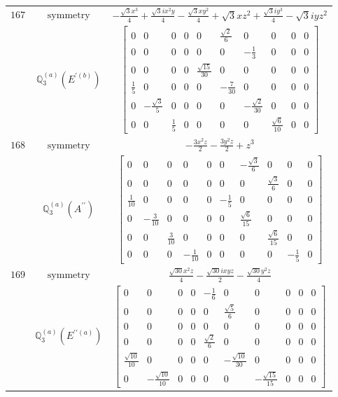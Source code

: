 \documentclass[fleqn,8pt,landscape]{jsarticle}
\begin{document}
\begin{longtable}{ccc}
$ 167 $ & $ \text{symmetry} $ & $ - \frac{\sqrt{3} x^{3}}{4} + \frac{\sqrt{3} i x^{2} y}{4} - \frac{\sqrt{3} x y^{2}}{4} + \sqrt{3} x z^{2} + \frac{\sqrt{3} i y^{3}}{4} - \sqrt{3} i y z^{2} $ \\
$  $ & $ \mathbb{Q}_{3}^{(a)}(E^{\prime(b)}) $ & $ \begin{bmatrix} 0 & 0 & 0 & 0 & 0 & \frac{\sqrt{2}}{6} & 0 & 0 & 0 & 0 \\ 0 & 0 & 0 & 0 & 0 & 0 & - \frac{1}{3} & 0 & 0 & 0 \\ 0 & 0 & 0 & 0 & \frac{\sqrt{15}}{30} & 0 & 0 & 0 & 0 & 0 \\ \frac{1}{5} & 0 & 0 & 0 & 0 & - \frac{7}{30} & 0 & 0 & 0 & 0 \\ 0 & - \frac{\sqrt{3}}{5} & 0 & 0 & 0 & 0 & - \frac{\sqrt{2}}{30} & 0 & 0 & 0 \\ 0 & 0 & \frac{1}{5} & 0 & 0 & 0 & 0 & \frac{\sqrt{6}}{10} & 0 & 0 \end{bmatrix} $ \\ \hline
$ 168 $ & $ \text{symmetry} $ & $ - \frac{3 x^{2} z}{2} - \frac{3 y^{2} z}{2} + z^{3} $ \\
$  $ & $ \mathbb{Q}_{3}^{(a)}(A^{\prime\prime}) $ & $ \begin{bmatrix} 0 & 0 & 0 & 0 & 0 & 0 & - \frac{\sqrt{3}}{6} & 0 & 0 & 0 \\ 0 & 0 & 0 & 0 & 0 & 0 & 0 & \frac{\sqrt{3}}{6} & 0 & 0 \\ \frac{1}{10} & 0 & 0 & 0 & 0 & - \frac{1}{5} & 0 & 0 & 0 & 0 \\ 0 & - \frac{3}{10} & 0 & 0 & 0 & 0 & \frac{\sqrt{6}}{15} & 0 & 0 & 0 \\ 0 & 0 & \frac{3}{10} & 0 & 0 & 0 & 0 & \frac{\sqrt{6}}{15} & 0 & 0 \\ 0 & 0 & 0 & - \frac{1}{10} & 0 & 0 & 0 & 0 & - \frac{1}{5} & 0 \end{bmatrix} $ \\ \hline
$ 169 $ & $ \text{symmetry} $ & $ \frac{\sqrt{30} x^{2} z}{4} - \frac{\sqrt{30} i x y z}{2} - \frac{\sqrt{30} y^{2} z}{4} $ \\
$  $ & $ \mathbb{Q}_{3}^{(a)}(E^{\prime\prime(a)}) $ & $ \begin{bmatrix} 0 & 0 & 0 & 0 & - \frac{1}{6} & 0 & 0 & 0 & 0 & 0 \\ 0 & 0 & 0 & 0 & 0 & \frac{\sqrt{5}}{6} & 0 & 0 & 0 & 0 \\ 0 & 0 & 0 & 0 & 0 & 0 & 0 & 0 & 0 & 0 \\ 0 & 0 & 0 & 0 & \frac{\sqrt{2}}{6} & 0 & 0 & 0 & 0 & 0 \\ \frac{\sqrt{10}}{10} & 0 & 0 & 0 & 0 & - \frac{\sqrt{10}}{30} & 0 & 0 & 0 & 0 \\ 0 & - \frac{\sqrt{10}}{10} & 0 & 0 & 0 & 0 & - \frac{\sqrt{15}}{15} & 0 & 0 & 0 \end{bmatrix} $ \\ \hline

\end{longtable}
\end{document}
